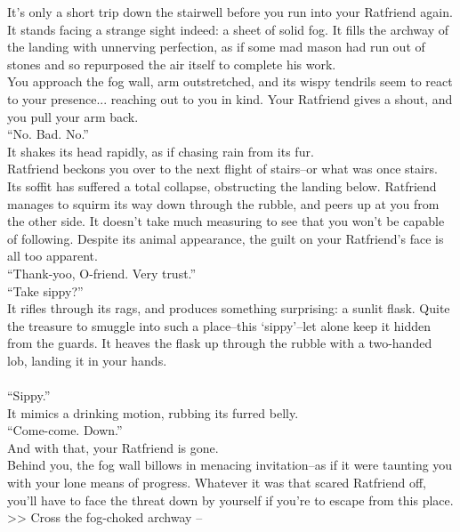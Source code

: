 It’s only a short trip down the stairwell before you run into your Ratfriend again. It stands facing a strange sight indeed: a sheet of solid fog. It fills the archway of the landing with unnerving perfection, as if some mad mason had run out of stones and so repurposed the air itself to complete his work.\\

You approach the fog wall, arm outstretched, and its wispy tendrils seem to react to your presence... reaching out to you in kind. Your Ratfriend gives a shout, and you pull your arm back.\\

“No. Bad. No.”\\
It shakes its head rapidly, as if chasing rain from its fur.\\

Ratfriend beckons you over to the next flight of stairs--or what was once stairs. Its soffit has suffered a total collapse, obstructing the landing below. Ratfriend manages to squirm its way down through the rubble, and peers up at you from the other side. It doesn’t take much measuring to see that you won’t be capable of following. Despite its animal appearance, the guilt on your Ratfriend’s face is all too apparent.\\

“Thank-yoo, O-friend. Very trust.”\\

“Take sippy?”\\
It rifles through its rags, and produces something surprising: a sunlit flask. Quite the treasure to smuggle into such a place--this ‘sippy’--let alone keep it hidden from the guards. It heaves the flask up through the rubble with a two-handed lob, landing it in your hands.\\
\\

“Sippy.”\\
It mimics a drinking motion, rubbing its furred belly.\\

“Come-come. Down.”\\
And with that, your Ratfriend is gone.\\

Behind you, the fog wall billows in menacing invitation--as if it were taunting you with your lone means of progress. Whatever it was that scared Ratfriend off, you’ll have to face the threat down by yourself if you’re to escape from this place.\\

>> Cross the fog-choked archway -- 
